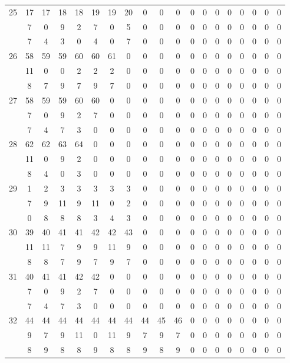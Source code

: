 \documentclass[letterpaper,12pt]{book}
\theoremstyle{definition} \newtheorem{Def}{Definición}[chapter]
\theoremstyle{definition} \newtheorem{Teo}{Teorema}[chapter]
\theoremstyle{definition} \newtheorem{Pro}{Proposición}[chapter]
\theoremstyle{definition} \newtheorem{Lema}{Lema}[chapter]
\begin{document}
\begin{table}
{\begin{tabular}{c c c c c c c c c c c c c c c c c c c}
25 & 17 & 17 & 18 & 18 & 19 & 19 & 20 & 0 & 0 & 0 & 0 & 0 & 0 & 0 & 0 & 0 & 0 & 0 \\ %
 & 7 & 0 & 9 & 2 & 7 & 0 & 5 & 0 & 0 & 0 & 0 & 0 & 0 & 0 & 0 & 0 & 0 & 0 \\ %
 & 7 & 4 & 3 & 0 & 4 & 0 & 7 & 0 & 0 & 0 & 0 & 0 & 0 & 0 & 0 & 0 & 0 & 0 \\ %
26 & 58 & 59 & 59 & 60 & 60 & 61 & 0 & 0 & 0 & 0 & 0 & 0 & 0 & 0 & 0 & 0 & 0 & 0 \\ %
 & 11 & 0 & 0 & 2 &  2 & 2 & 0 &  0 & 0 & 0 & 0 & 0 & 0 & 0 & 0 & 0 & 0 & 0 \\ %
 & 8 & 7 & 9 & 7 & 9 & 7 & 0 & 0 & 0 & 0 & 0 & 0 & 0 & 0 & 0 & 0 & 0 & 0 \\%
27 & 58 & 59 & 59 & 60 & 60 & 0 & 0 & 0 & 0 & 0 & 0 & 0 & 0 & 0 & 0 & 0 & 0 & 0 \\ %
 & 7 & 0 & 9 & 2 & 7 & 0 & 0 & 0 & 0 & 0 & 0 & 0 & 0 & 0 & 0 & 0 & 0 & 0 \\ %
 & 7 & 4 & 7 & 3 & 0 & 0 & 0 & 0 & 0 & 0 & 0 & 0 & 0 & 0 & 0 & 0 & 0 & 0 \\ %
28 & 62 & 62 & 63 & 64 & 0 & 0 & 0 & 0 & 0 & 0 & 0 & 0 & 0 & 0 & 0 & 0 & 0 & 0 \\ %
 & 11& 0 & 9 & 2 & 0 & 0 & 0 & 0 & 0 & 0 & 0 & 0 & 0 & 0 & 0 & 0 & 0 & 0 \\ %
 & 8 & 4 & 0 & 3 & 0 & 0 &  0 & 0 & 0 & 0 & 0 & 0 & 0 & 0 & 0 & 0 & 0 & 0 \\ %
29 & 1 & 2 & 3 & 3 & 3 & 3 & 3 & 0 & 0 & 0 & 0 & 0 & 0 & 0 & 0 & 0 & 0 & 0 \\ %
 & 7 & 9 & 11 & 9 & 11 & 0 &  2 & 0 & 0 & 0 & 0 & 0 & 0 & 0 & 0 & 0 & 0 & 0 \\ %
 & 0 & 8 & 8 & 8 & 3 & 4 & 3 & 0 & 0 & 0 & 0 & 0 & 0 & 0 & 0 & 0 & 0 & 0 \\ %
30 & 39 & 40 & 41 & 41 & 42 & 42 & 43 & 0 & 0 & 0 & 0 & 0 & 0 & 0 & 0 & 0 & 0 & 0 \\ %
 & 11 & 11& 7 & 9 & 9 & 11 & 9 & 0 & 0 & 0 & 0 & 0 & 0 & 0 & 0 & 0 & 0 & 0 \\ %
 & 8 & 8 & 7 & 9 & 7 & 9 & 7 & 0 & 0 & 0 & 0 & 0 & 0 & 0 & 0 & 0 & 0 & 0 \\ %
31 & 40 & 41 & 41 & 42 & 42 & 0 &  0 & 0 & 0 & 0 & 0 & 0 & 0 & 0 & 0 & 0 & 0 & 0 \\ %
 & 7 & 0 & 9 & 2 & 7 & 0 & 0 & 0 & 0 & 0 & 0 & 0 & 0 & 0 & 0 & 0 & 0 & 0 \\ %
 & 7 & 4 & 7 & 3 & 0 & 0 & 0 & 0 & 0 & 0 & 0 & 0 & 0 & 0 & 0 & 0 & 0 & 0 \\ %
32 & 44 & 44 & 44 & 44 & 44 & 44 & 44 & 44 & 45 & 46 & 0 & 0 & 0 & 0 & 0 & 0 & 0 & 0 \\%
 & 9 & 7 & 9 & 11 & 0 & 11 & 9 & 7 & 9 & 7 & 0 & 0 & 0 & 0 & 0 & 0 & 0 & 0 \\%
 & 8 & 9 & 8 & 8 & 9 & 8 & 8 & 9 & 8 & 9 & 0 & 0 & 0 & 0 & 0 & 0 & 0 & 0 \\ %
\end{tabular}
}
\end{table}
\end{document}
